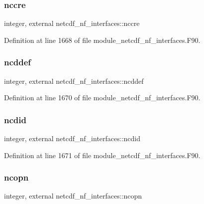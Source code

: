 \subsubsection{\texorpdfstring{nccre}{nccre}}
{\footnotesize\ttfamily integer, external netcdf\+\_\+nf\+\_\+interfaces\+::nccre}



Definition at line 1668 of file module\+\_\+netcdf\+\_\+nf\+\_\+interfaces.\+F90.

\mbox{\label{namespacenetcdf__nf__interfaces_a8a4ac4b41a06eaccfd346a131fd414ec}} 
\subsubsection{\texorpdfstring{ncddef}{ncddef}}
{\footnotesize\ttfamily integer, external netcdf\+\_\+nf\+\_\+interfaces\+::ncddef}



Definition at line 1670 of file module\+\_\+netcdf\+\_\+nf\+\_\+interfaces.\+F90.

\mbox{\label{namespacenetcdf__nf__interfaces_a750d36a44917a843c7d3b7d6d913cc46}} 
\subsubsection{\texorpdfstring{ncdid}{ncdid}}
{\footnotesize\ttfamily integer, external netcdf\+\_\+nf\+\_\+interfaces\+::ncdid}



Definition at line 1671 of file module\+\_\+netcdf\+\_\+nf\+\_\+interfaces.\+F90.

\mbox{\label{namespacenetcdf__nf__interfaces_a057b10a968928383fda154c197079de3}} 
\subsubsection{\texorpdfstring{ncopn}{ncopn}}
{\footnotesize\ttfamily integer, external netcdf\+\_\+nf\+\_\+interfaces\+::ncopn}



